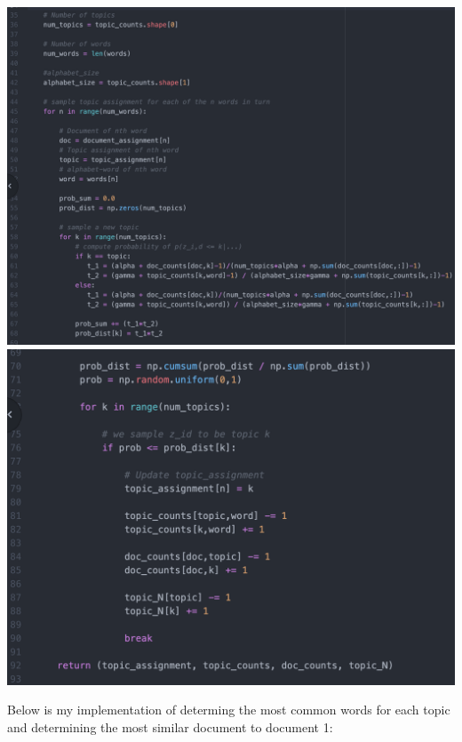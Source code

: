 \documentclass[11pt]{article}
\theoremstyle{definition}
\begin{document}
\begin{enumerate}
\begin{center}
\includegraphics[scale=0.4]{figures/sample_func_1}
\includegraphics[scale=0.5]{figures/sample_2}
\end{center}

Below is my implementation of determing the most common words for each topic and determining the most similar document to document 1:


\end{enumerate}
\end{document}

